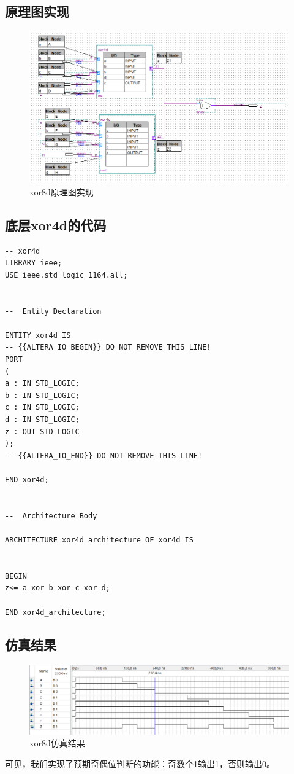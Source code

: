\documentclass{article}
\begin{document}
\subsection{原理图实现}
\begin{figure}[H]
\centering
\includegraphics[width=\textwidth]{xor8d_layout}
\caption{xor8d原理图实现}
\end{figure}
\subsection{底层xor4d的代码}
\begin{lstlisting}
-- xor4d
LIBRARY ieee;
USE ieee.std_logic_1164.all;


--  Entity Declaration

ENTITY xor4d IS
-- {{ALTERA_IO_BEGIN}} DO NOT REMOVE THIS LINE!
PORT
(
a : IN STD_LOGIC;
b : IN STD_LOGIC;
c : IN STD_LOGIC;
d : IN STD_LOGIC;
z : OUT STD_LOGIC
);
-- {{ALTERA_IO_END}} DO NOT REMOVE THIS LINE!

END xor4d;


--  Architecture Body

ARCHITECTURE xor4d_architecture OF xor4d IS


BEGIN
z<= a xor b xor c xor d;

END xor4d_architecture;
\end{lstlisting}
\subsection{仿真结果}
\begin{figure}[H]
\centering
\includegraphics[width=\textwidth]{xor8d_output}
\caption{xor8d仿真结果}
\end{figure}
可见，我们实现了预期奇偶位判断的功能：奇数个1输出1，否则输出0。
\end{document}
